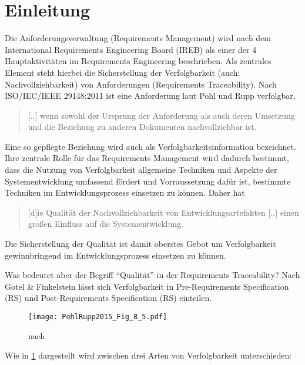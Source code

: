 \section{Einleitung}
Die Anforderungsverwaltung (Requirements Management) wird nach dem International Requirements Engineering Board (IREB)  als einer der 4 Hauptaktivitäten im Requirements Engineering beschrieben.
Als zentrales Element steht hierbei die Sicherstellung der Verfolgbarkeit (auch: Nachvollziehbarkeit) von Anforderungen (Requirements Traceability). \cite{Pohl2015BasiswissenIREB-Standard}
Nach ISO/IEC/IEEE 29148:2011 ist eine Anforderung laut Pohl und Rupp verfolgbar,
\begin{quote}
[..] wenn sowohl der Ursprung der Anforderung als auch deren Umsetzung und die Beziehung zu anderen Dokumenten nachvollziehbar ist. \cite[S.48]{Pohl2015BasiswissenIREB-Standard}
\end{quote}
Eine so gepflegte Beziehung wird auch als Verfolgbarkeitsinformation bezeichnet. Ihre zentrale Rolle für das Requirements Management wird dadurch bestimmt, dass die Nutzung von Verfolgbarkeit allgemeine Techniken und Aspekte der Systementwicklung umfassend fördert und Vorraussetzung dafür ist, bestimmte Techniken im Entwicklungsprozess einsetzen zu können. \cite{Pohl2008RequirementsTechniken} Daher hat 
\begin{quote}
[d]ie Qualität der Nachvollziehbarkeit von Entwicklungsartefakten [..] einen großen Einfluss auf die Systementwicklung. \cite[S.507]{Pohl2008RequirementsTechniken}
\end{quote}
Die Sicherstellung der Qualität ist damit oberstes Gebot um Verfolgbarkeit gewinnbringend im Entwicklungsprozess einsetzen zu können. 

Was bedeutet aber der Begriff \enquote{Qualität} in der Requirements Traceability? Nach Gotel \& Finkelstein lässt sich Verfolgbarkeit in Pre-Requirements Specification (RS) und Post-Requirements Specification (RS) einteilen. 

\begin{figure}[!htb]
  \centering
  \texttt{[image: PohlRupp2015\_Fig\_8\_5.pdf]}
  \caption{nach \cite[Fig. 8.5]{Pohl2015BasiswissenIREB-Standard}}
  \label{fig:abb1}
\end{figure}

Wie in \ref{fig:abb1} dargestellt wird zwischen drei Arten von Verfolgbarkeit unterschieden:

